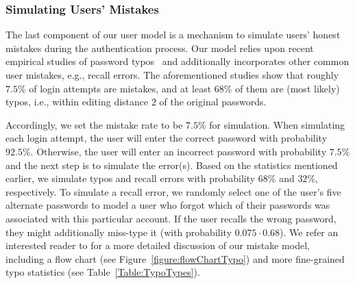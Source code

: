 \subsubsection{Simulating Users' Mistakes}\label{section:ExperimentDesign-subsection:SimulateUser-subsubsection:SimulateUserMistake} %

The last component of our user model is a mechanism to simulate users’ honest mistakes during the authentication process. Our model relies upon recent empirical studies of password typos~\cite{CCS:CWPCR17,SP:CAAJR16} and additionally incorporates other common user mistakes, e.g., recall errors. The aforementioned studies show that roughly $7.5\%$ of login attempts are mistakes, and at least $68\%$ of them are (most likely) typos, i.e., within editing distance $2$ of the original passwords.  



Accordingly, we set the mistake rate to be $7.5\%$ for simulation. When simulating each login attempt, the user will enter the correct password with probability $92.5\%$. Otherwise, the user will enter an incorrect password with probability $7.5\%$ and the next step is to simulate the error(s). Based on the statistics mentioned earlier, we simulate typos and recall errors with probability $68\%$ and $32\%$, respectively. To simulate a recall error, we randomly select one of the user's five alternate passwords to model a user who forgot which of their passwords was associated with this particular account. If the user recalls the wrong password, they might additionally miss-type it (with probability $0.075\cdot 0.68$).  We refer an interested reader to  for a more detailed discussion of our mistake model, including a flow chart (see Figure~\ref{figure:flowChartTypo}) and more fine-grained typo statistics (see  Table~\ref{Table:TypoTypes}).

















